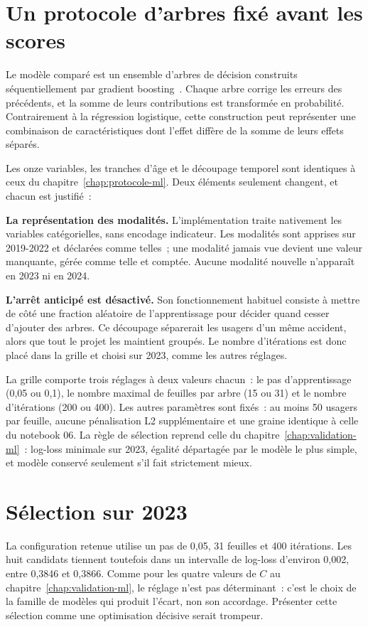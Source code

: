 \section{Un protocole d'arbres fixé avant les scores}
Le modèle comparé est un ensemble d'arbres de décision construits séquentiellement par
gradient boosting~\cite{sklearn-hgb}. Chaque arbre corrige les erreurs des précédents,
et la somme de leurs contributions est transformée en probabilité. Contrairement à la
régression logistique, cette construction peut représenter une combinaison de
caractéristiques dont l'effet diffère de la somme de leurs effets séparés.

Les onze variables, les tranches d'âge et le découpage temporel sont identiques à ceux
du chapitre~\ref{chap:protocole-ml}. Deux éléments seulement changent, et chacun est
justifié~:

\textbf{La représentation des modalités.} L'implémentation traite nativement les
variables catégorielles, sans encodage indicateur. Les modalités sont apprises sur
2019-2022 et déclarées comme telles~; une modalité jamais vue devient une valeur
manquante, gérée comme telle et comptée. Aucune modalité nouvelle n'apparaît en 2023
ni en 2024.

\textbf{L'arrêt anticipé est désactivé.} Son fonctionnement habituel consiste à mettre
de côté une fraction aléatoire de l'apprentissage pour décider quand cesser d'ajouter
des arbres. Ce découpage séparerait les usagers d'un même accident, alors que tout le
projet les maintient groupés. Le nombre d'itérations est donc placé dans la grille et
choisi sur 2023, comme les autres réglages.

La grille comporte trois réglages à deux valeurs chacun~: le pas d'apprentissage
(0,05 ou 0,1), le nombre maximal de feuilles par arbre (15 ou 31) et le nombre
d'itérations (200 ou 400). Les autres paramètres sont fixés~: au moins 50 usagers par
feuille, aucune pénalisation L2 supplémentaire et une graine identique à celle du
notebook 06. La règle de sélection reprend celle du chapitre~\ref{chap:validation-ml}~:
log-loss minimale sur 2023, égalité départagée par le modèle le plus simple, et modèle
conservé seulement s'il fait strictement mieux.

\section{Sélection sur 2023}


La configuration retenue utilise un pas de 0,05, 31 feuilles et 400 itérations.
Les huit candidats tiennent toutefois dans un intervalle de log-loss d'environ 0,002,
entre 0,3846 et 0,3866.
Comme pour les quatre valeurs de $C$ au chapitre~\ref{chap:validation-ml}, le réglage
n'est pas déterminant~: c'est le choix de la famille de modèles qui produit l'écart,
non son accordage. Présenter cette sélection comme une optimisation décisive serait
trompeur.

